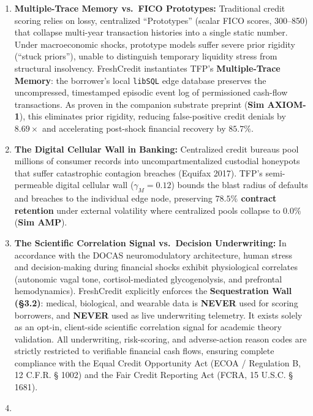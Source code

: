 \documentclass[
]{article}
\providecommand{\tightlist}{%
  \setlength{\itemsep}{0pt}\setlength{\parskip}{0pt}}
\begin{document}
\begin{enumerate}
\def\labelenumi{\arabic{enumi}.}
\tightlist
\item
  \textbf{Multiple-Trace Memory vs.~FICO Prototypes:} Traditional credit
  scoring relies on lossy, centralized ``Prototypes'' (scalar FICO
  scores, 300--850) that collapse multi-year transaction histories into
  a single static number. Under macroeconomic shocks, prototype models
  suffer severe prior rigidity (``stuck priors''), unable to distinguish
  temporary liquidity stress from structural insolvency. FreshCredit
  instantiates TFP's \textbf{Multiple-Trace Memory}: the borrower's
  local \texttt{libSQL} edge database preserves the uncompressed,
  timestamped episodic event log of permissioned cash-flow transactions.
  As proven in the companion substrate preprint (\textbf{Sim AXIOM-1}),
  this eliminates prior rigidity, reducing false-positive credit denials
  by \textbf{\(8.69\times\)} and accelerating post-shock financial
  recovery by \textbf{\(85.7\%\)}.
\item
  \textbf{The Digital Cellular Wall in Banking:} Centralized credit
  bureaus pool millions of consumer records into uncompartmentalized
  custodial honeypots that suffer catastrophic contagion breaches
  (Equifax 2017). TFP's semi-permeable digital cellular wall
  (\(\gamma_M = 0.12\)) bounds the blast radius of defaults and breaches
  to the individual edge node, preserving \textbf{\(78.5\%\) contract
  retention} under external volatility where centralized pools collapse
  to \(0.0\%\) (\textbf{Sim AMP}).
\item
  \textbf{The Scientific Correlation Signal vs.~Decision Underwriting:}
  In accordance with the DOCAS neuromodulatory architecture, human
  stress and decision-making during financial shocks exhibit
  physiological correlates (autonomic vagal tone, cortisol-mediated
  glycogenolysis, and prefrontal hemodynamics). FreshCredit explicitly
  enforces the \textbf{Sequestration Wall (§3.2)}: medical, biological,
  and wearable data is \textbf{NEVER} used for scoring borrowers, and
  \textbf{NEVER} used as live underwriting telemetry. It exists solely
  as an opt-in, client-side scientific correlation signal for academic
  theory validation. All underwriting, risk-scoring, and adverse-action
  reason codes are strictly restricted to verifiable financial cash
  flows, ensuring complete compliance with the Equal Credit Opportunity
  Act (ECOA / Regulation B, 12 C.F.R. § 1002) and the Fair Credit
  Reporting Act (FCRA, 15 U.S.C. § 1681).
\item

\end{enumerate}
\end{document}
